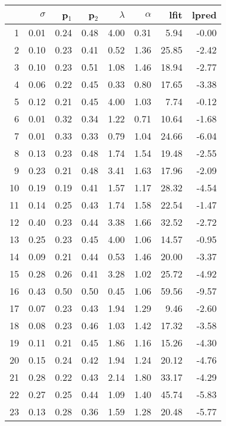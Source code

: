 \begin{table}[!htb]
\centering
\begin{tabular}{rrrrrrrr}
  \hline
 & $\sigma$ & p$_{1}$ & p$_{2}$ & $\lambda$ & $\alpha$ & lfit & lpred \\ 
  \hline
1 & 0.01 & 0.24 & 0.48 & 4.00 & 0.31 & 5.94 & -0.00 \\ 
  2 & 0.10 & 0.23 & 0.41 & 0.52 & 1.36 & 25.85 & -2.42 \\ 
  3 & 0.10 & 0.23 & 0.51 & 1.08 & 1.46 & 18.94 & -2.77 \\ 
  4 & 0.06 & 0.22 & 0.45 & 0.33 & 0.80 & 17.65 & -3.38 \\ 
  5 & 0.12 & 0.21 & 0.45 & 4.00 & 1.03 & 7.74 & -0.12 \\ 
  6 & 0.01 & 0.32 & 0.34 & 1.22 & 0.71 & 10.64 & -1.68 \\ 
  7 & 0.01 & 0.33 & 0.33 & 0.79 & 1.04 & 24.66 & -6.04 \\ 
  8 & 0.13 & 0.23 & 0.48 & 1.74 & 1.54 & 19.48 & -2.55 \\ 
  9 & 0.23 & 0.21 & 0.48 & 3.41 & 1.63 & 17.96 & -2.09 \\ 
  10 & 0.19 & 0.19 & 0.41 & 1.57 & 1.17 & 28.32 & -4.54 \\ 
  11 & 0.14 & 0.25 & 0.43 & 1.74 & 1.58 & 22.54 & -1.47 \\ 
  12 & 0.40 & 0.23 & 0.44 & 3.38 & 1.66 & 32.52 & -2.72 \\ 
  13 & 0.25 & 0.23 & 0.45 & 4.00 & 1.06 & 14.57 & -0.95 \\ 
  14 & 0.09 & 0.21 & 0.44 & 0.53 & 1.46 & 20.00 & -3.37 \\ 
  15 & 0.28 & 0.26 & 0.41 & 3.28 & 1.02 & 25.72 & -4.92 \\ 
  16 & 0.43 & 0.50 & 0.50 & 0.45 & 1.06 & 59.56 & -9.57 \\ 
  17 & 0.07 & 0.23 & 0.43 & 1.94 & 1.29 & 9.46 & -2.60 \\ 
  18 & 0.08 & 0.23 & 0.46 & 1.03 & 1.42 & 17.32 & -3.58 \\ 
  19 & 0.11 & 0.21 & 0.45 & 1.86 & 1.16 & 15.26 & -4.30 \\ 
  20 & 0.15 & 0.24 & 0.42 & 1.94 & 1.24 & 20.12 & -4.76 \\ 
  21 & 0.28 & 0.22 & 0.43 & 2.14 & 1.80 & 33.17 & -4.29 \\ 
  22 & 0.27 & 0.25 & 0.44 & 1.09 & 1.40 & 45.74 & -5.83 \\ 
  23 & 0.13 & 0.28 & 0.36 & 1.59 & 1.28 & 20.48 & -5.77 \\ 

\end{tabular}
\end{table}
